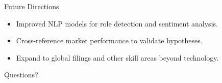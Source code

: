 \documentclass{beamer}
\begin{document}
\begin{frame}{Future Directions}
  \begin{itemize}
    \item Improved NLP models for role detection and sentiment analysis.
    \item Cross-reference market performance to validate hypotheses.
    \item Expand to global filings and other skill areas beyond technology.
  \end{itemize}
\end{frame}

\begin{frame}
  \centering
  \huge Questions?
\end{frame}
\end{document}
